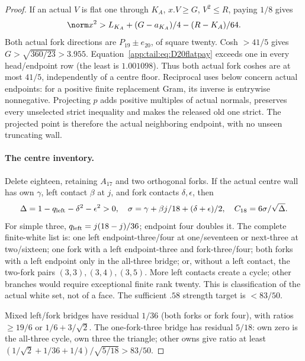 \begin{proof}
If an actual $V$ is flat one through $K_A$, $x.V\ge G$,
$V^2\le R$, paying $1/8$ gives
\begin{equation}\label{app:tail:eq:D20flatpay}
 \norm x^2>L_{K_A}+(G-a_{K_A})/4-(R-K_A)/64.
\end{equation}
Both actual fork directions are $P_{19}\pm e_{20}$, of square
twenty. Cosh $>41/5$ gives $G>\sqrt{360/23}>3.955$.
Equation~\eqref{app:tail:eq:D20flatpay} exceeds one in every
head/endpoint row (the least is $1.001098$).
Thus both actual fork coshes are at most $41/5$, independently
of a centre floor. Reciprocal uses below concern actual endpoints:
for a positive finite replacement Gram, its inverse is entrywise
nonnegative. Projecting $p$ adds positive multiples of actual
normals, preserves every unselected strict inequality and makes
the released old one strict. The projected point is therefore
the actual neighboring endpoint, with no unseen truncating wall.

\paragraph{The centre inventory.}
Delete eighteen, retaining $A_{17}$ and two orthogonal forks.
If the actual centre wall has own $\gamma$, left contact
$\beta$ at $j$, and fork contacts $\delta,\epsilon$, then
\[
 \Delta=1-q_{\rm left}-\delta^2-\epsilon^2>0,
 \quad \sigma=\gamma+\beta j/18+(\delta+\epsilon)/2,
 \quad C_{18}=6\sigma/\sqrt\Delta.
\]
For simple three, $q_{\rm left}=j(18-j)/36$; endpoint four
doubles it. The complete finite-white list is: one left
endpoint-three/four at one/seventeen or next-three at two/sixteen;
one fork with a left endpoint-three and fork-three/four;
both forks with a left endpoint only in the all-three bridge;
or, without a left contact, the two-fork pairs
$(3,3),(3,4),(3,5)$. More left contacts create a cycle;
other branches would require exceptional finite rank twenty.
This is classification of the actual white set, not of a face.
The sufficient $.58$ strength target is $<83/50$.

Mixed left/fork bridges have residual $1/36$ (both forks or
fork four), with ratios $\ge19/6$ or $1/6+3/\sqrt2$.
The one-fork-three bridge has residual $5/18$: own zero is
the all-three cycle, own three the triangle; other owns give
ratio at least $(1/\sqrt2+1/36+1/4)/\sqrt{5/18}>83/50$.


\end{proof}
